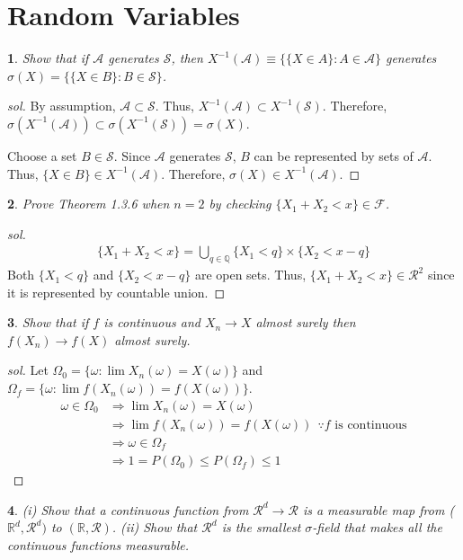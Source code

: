 \documentclass{report}
\newtheorem{ex}{}[section]
\begin{document}
\section{Random Variables}
\begin{ex}
Show that if $\mathcal{A}$ generates $\mathcal{S}$, then $X^{-1}(\mathcal{A}) \equiv \{\{X \in A\} : A \in \mathcal{A}\}$ generates $\sigma(X) = \{\{X \in B\} : B \in \mathcal{S}\}$.
\end{ex}
\begin{proof}[sol]
By assumption, $\mathcal{A} \subset \mathcal{S}$. Thus,  $X^{-1}(\mathcal{A})\subset X^{-1}(\mathcal{S})$. Therefore, $\sigma(X^{-1}(\mathcal{A}))\subset\sigma( X^{-1}(\mathcal{S})) = \sigma(X)$.

Choose a set $B \in \mathcal{S}$. Since $\mathcal{A}$ generates $\mathcal{S}$, $B$ can be represented by sets of $\mathcal{A}$. Thus, $\{X \in B\} \in X^{-1}(\mathcal{A})$. Therefore, $\sigma(X) \in X^{-1}(\mathcal{A})$.
\end{proof}
\begin{ex}
Prove Theorem 1.3.6 when $n = 2$ by checking $\{X_1+X_2 < x\} \in \mathcal{F}$.
\end{ex}
\begin{proof}[sol]
\begin{align*}
    \{X_1+X_2 < x\} = \bigcup_{q \in \mathbb{Q}} \{X_1 < q\}\times \{X_2 < x-q\}
\end{align*}
Both $\{X_1 < q\}$ and $\{X_2 < x-q\}$ are open sets. Thus, $\{X_1+X_2 < x\} \in \mathcal{R}^2$ since it is represented by countable union.
\end{proof}
\begin{ex}
Show that if $f$ is continuous and $X_n \to X$ almost surely then $f(X_n) \to f(X)$ almost surely.
\end{ex}
\begin{proof}[sol]
Let $\Omega_0 = \{\omega : \lim X_n(\omega) = X(\omega)\}$ and $\Omega_f = \{\omega : \lim f(X_n(\omega)) = f(X(\omega))\}$.
\begin{align*}
    \omega \in \Omega_0 &\Rightarrow \lim X_n(\omega) = X(\omega)\\
    &\Rightarrow \lim f(X_n(\omega)) = f(X(\omega))  \ \ \because f\text{ is continuous}\\
    &\Rightarrow \omega \in \Omega_f\\
    &\Rightarrow 1 = P(\Omega_0) \le P(\Omega_f)\le 1
\end{align*}
\end{proof}
\begin{ex}
(i) Show that a continuous function from $\mathcal{R}^d \to \mathcal{R}$ is a measurable map from ($\mathbb{R}^d,\mathcal{R}^d)$ to $(\mathbb{R},\mathcal{R})$. (ii) Show that $\mathcal{R}^d$ is the smallest $\sigma$-field that makes all the continuous functions measurable.
\end{ex}
\end{document}
